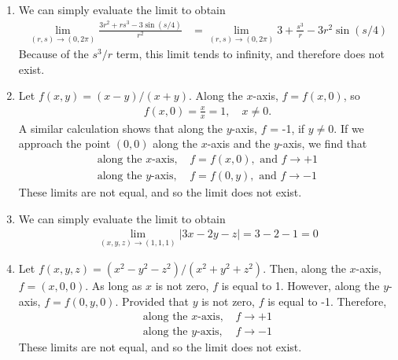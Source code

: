 \item
\begin{enumerate}
\item We can simply evaluate the limit to obtain
\begin{align*}
\lim_{(r,s)\rightarrow(0,2\pi) } \frac{3r^2+rs^3-3\sin (s/4)}{r^2}
&= \lim_{(r,s)\rightarrow(0,2\pi) }3+\frac{s^3}{r}-3r^2\sin (s/4)
\end{align*}
Because of the $s^3/r$ term, this limit tends to infinity, and therefore does not exist.
\item Let $f(x,y) = (x-y)/(x+y)$. Along the $x$-axis, $f=f(x,0)$, so 
\begin{align*}
f(x,0) = \frac{x}{x} = 1, \quad x\ne 0.
\end{align*}
A similar calculation shows that along the $y$-axis, $f$ = -1, if $y\ne0$. If we approach the point $(0,0)$ along the $x$-axis and the $y$-axis, we find that 
\begin{align*}
\text{along the $x$-axis, } & f = f(x,0),\text{ and } f \rightarrow +1 \\
\text{along the $y$-axis, } & f = f(0,y),\text{ and } f \rightarrow -1 
\end{align*}
These limits are not equal, and so the limit does not exist. 
\item We can simply evaluate the limit to obtain 
\begin{align*}
  \lim_{(x,y,z)\rightarrow(1,1,1)} \big|3x - 2y - z \big| = 3 -2 -1 = 0
\end{align*}
\item  Let $f(x,y,z) = (x^2-y^2-z^2)/(x^2+y^2+z^2)$. Then, along the $x$-axis, $f=(x,0,0)$. As long as $x$ is not zero, $f$ is equal to 1. However, along the $y$-axis, $f=f(0,y,0)$. Provided that $y$ is not zero, $f$ is equal to -1. Therefore,
\begin{align*}
\text{along the $x$-axis, } & f \rightarrow +1 \\
\text{along the $y$-axis, } & f \rightarrow -1 
\end{align*}
These limits are not equal, and so the limit does not exist. 

\end{enumerate}
